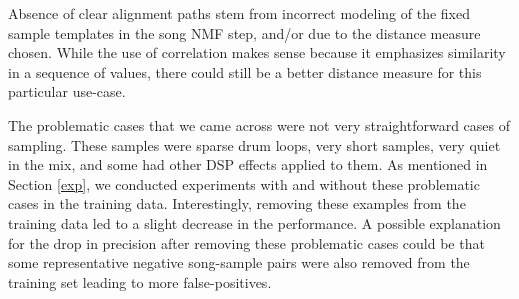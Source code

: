 \documentclass{article}
\begin{document}
Absence of clear alignment paths stem from incorrect modeling of the fixed sample templates in the song NMF step, and/or due to the distance measure chosen. While the use of correlation makes sense because it emphasizes similarity in a sequence of values, there could still be a better distance measure for this particular use-case.

The problematic cases that we came across were not very straightforward cases of sampling. These samples were sparse drum loops, very short samples, very quiet in the mix, and some had other DSP effects applied to them. As mentioned in Section \ref{exp}, we conducted experiments with and without these problematic cases in the training data. Interestingly, removing these examples from the training data led to a slight decrease in the performance. A possible explanation for the drop in precision after removing these problematic cases could be that some representative negative song-sample pairs were also removed from the training set leading to more false-positives.




\end{document}
